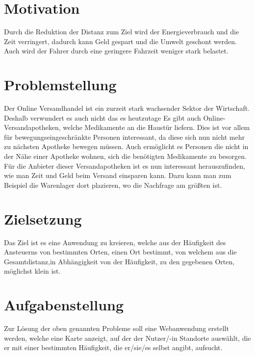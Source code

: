\documentclass[a4paper, 12pt]{scrreprt}
\begin{document}
\section{Motivation}
Durch die Reduktion der Distanz zum Ziel wird der Energieverbrauch und die Zeit verringert, dadurch kann Geld gespart und die Umwelt geschont werden.
Auch wird der Fahrer durch eine geringere Fahrzeit weniger stark belastet.
\section{Problemstellung}
Der Online Versandhandel ist ein zurzeit stark wachsender Sektor der Wirtschaft.\cite{Stepper2016}
Deshalb verwundert es auch nicht das es heutzutage
Es gibt auch Online-Versandapotheken, welche Medikamente an die Haustür liefern.
Dies ist vor allem für bewegungseingeschränkte Personen interessant, da diese sich nun nicht mehr zu nächsten Apotheke bewegen müssen.
Auch ermöglicht es Personen die nicht in der Nähe einer Apotheke wohnen, sich die benötigten Medikamente zu besorgen.
Für die Anbieter dieser Versandapotheken ist es nun interessant herauszufinden, wie man Zeit und Geld beim Versand einsparen kann.
Dazu kann man zum Beispiel die Warenlager dort plazieren, wo die Nachfrage am größten ist.
\section{Zielsetzung}
Das Ziel ist es eine Anwendung zu kreieren, welche aus der Häufigkeit des Ansteuerns von bestimmten Orten, einen Ort bestimmt, von welchem aus die Gesamtdistanz,in Abhängigkeit von der Häufigkeit, zu den gegebenen Orten, möglichst klein ist.
\section{Aufgabenstellung}
Zur Lösung der oben genannten Probleme soll eine Webanwendung erstellt werden, welche eine Karte anzeigt, auf der der Nutzer/-in Standorte auswählt, die er mit einer bestimmten Häufigkeit, die er/sie/es selbst angibt, aufsucht.
\newpage
\end{document}
